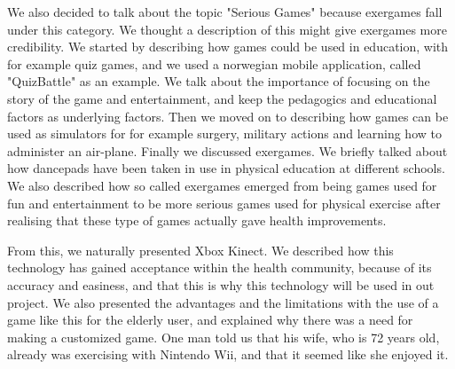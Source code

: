 We also decided to talk about the topic "Serious Games" because exergames fall under this category. We thought a description of this might give exergames more credibility. We started by describing how games could be used in education, with for example quiz games, and we used a norwegian mobile application, called "QuizBattle" as an example. We talk about the importance of focusing on the story of the game and entertainment, and keep the pedagogics and educational factors as underlying factors. Then we moved on to describing how games can be used as simulators for for example surgery, military actions and learning how to administer an air-plane. Finally we discussed exergames. We briefly talked about how dancepads have been taken in use in physical education at different schools. We also described how so called exergames emerged from being games used for fun and entertainment to be more serious games used for physical exercise after realising that these type of games actually gave health improvements.

From this, we naturally presented Xbox Kinect. We described how this technology has gained acceptance within the health community, because of its accuracy and easiness, and that this is why this technology will be used in out project. We also presented the advantages and the limitations with the use of a  game like this for the elderly user, and explained why there was a need for making a customized game. One man told us that his wife, who is 72 years old, already was exercising with Nintendo Wii, and that it seemed like she enjoyed it.

